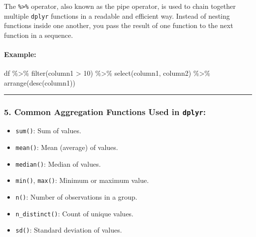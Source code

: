 \documentclass[
  letterpaper,
  DIV=11,
  numbers=noendperiod]{scrartcl}
\let\oldparagraph\paragraph
\renewcommand{\paragraph}[1]{\oldparagraph{#1}\mbox{}}
\newenvironment{Shaded}{\begin{snugshade}}{\end{snugshade}}
\newcommand{\DecValTok}[1]{\textcolor[rgb]{0.68,0.00,0.00}{#1}}
\newcommand{\FunctionTok}[1]{\textcolor[rgb]{0.28,0.35,0.67}{#1}}
\newcommand{\NormalTok}[1]{\textcolor[rgb]{0.00,0.23,0.31}{#1}}
\newcommand{\SpecialCharTok}[1]{\textcolor[rgb]{0.37,0.37,0.37}{#1}}
\providecommand{\tightlist}{%
  \setlength{\itemsep}{0pt}\setlength{\parskip}{0pt}}\usepackage{longtable,booktabs,array}
\begin{document}
The \texttt{\%\textgreater{}\%} operator, also known as the pipe
operator, is used to chain together multiple \texttt{dplyr} functions in
a readable and efficient way. Instead of nesting functions inside one
another, you pass the result of one function to the next function in a
sequence.

\paragraph{\texorpdfstring{\textbf{Example:}}{Example:}}\label{example}

\begin{Shaded}
\begin{Highlighting}[]
\NormalTok{df }\SpecialCharTok{\%\textgreater{}\%}
  \FunctionTok{filter}\NormalTok{(column1 }\SpecialCharTok{\textgreater{}} \DecValTok{10}\NormalTok{) }\SpecialCharTok{\%\textgreater{}\%}
  \FunctionTok{select}\NormalTok{(column1, column2) }\SpecialCharTok{\%\textgreater{}\%}
  \FunctionTok{arrange}\NormalTok{(}\FunctionTok{desc}\NormalTok{(column1))}
\end{Highlighting}
\end{Shaded}

\begin{center}\rule{0.5\linewidth}{0.5pt}\end{center}

\subsubsection{\texorpdfstring{5. \textbf{Common Aggregation Functions
Used in
\texttt{dplyr}:}}{5. Common Aggregation Functions Used in dplyr:}}\label{common-aggregation-functions-used-in-dplyr}

\begin{itemize}
\tightlist
\item
  \texttt{sum()}: Sum of values.
\item
  \texttt{mean()}: Mean (average) of values.
\item
  \texttt{median()}: Median of values.
\item
  \texttt{min()}, \texttt{max()}: Minimum or maximum value.
\item
  \texttt{n()}: Number of observations in a group.
\item
  \texttt{n\_distinct()}: Count of unique values.
\item
  \texttt{sd()}: Standard deviation of values.
\end{itemize}
\end{document}
